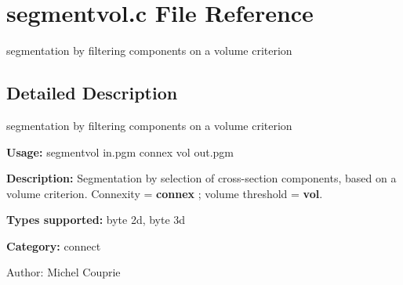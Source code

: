 \section{segmentvol.c File Reference}
\label{segmentvol_8c}
segmentation by filtering components on a volume criterion  




\label{_details}
\subsection{Detailed Description}
segmentation by filtering components on a volume criterion 

{\bf Usage:} segmentvol in.pgm connex vol out.pgm

{\bf Description:} Segmentation by selection of cross-section components, based on a volume criterion. Connexity = {\bf connex} ; volume threshold = {\bf vol}.

{\bf Types supported:} byte 2d, byte 3d

{\bf Category:} connect

\begin{Desc}
\item[Author:]Michel Couprie \end{Desc}
